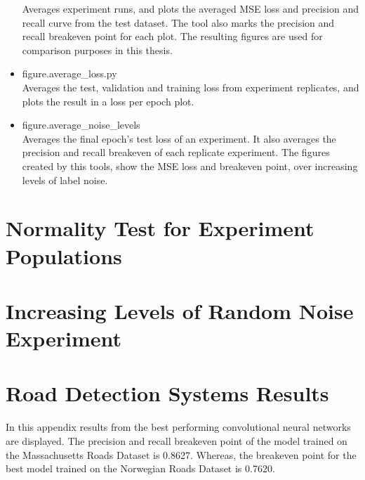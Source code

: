 \begin{itemize}
Averages experiment runs, and plots the averaged MSE loss and precision and recall curve from the test dataset. The tool also marks the precision and recall breakeven point for each plot. The resulting figures are used for comparison purposes in this thesis.
\item figure.average\_loss.py\\
Averages the test, validation and training loss from experiment replicates, and plots the result in a loss per epoch plot. 
\item figure.average\_noise\_levels\\
Averages the final epoch's test loss of an experiment. It also averages the precision and recall breakeven of each replicate experiment. The figures created by this tools, show the MSE loss and breakeven point, over increasing levels of label noise.
\end{itemize}

\section{Normality Test for Experiment Populations}
\label{app:normality}

\section{Increasing Levels of Random Noise Experiment}
\label{app:randomnoiseexperiment}

\pagebreak
\section{Road Detection Systems Results}
\label{app:roaddetectionresults}
In this appendix results from the best performing convolutional neural networks are displayed. The precision and recall breakeven point of the model trained on the Massachusetts Roads Dataset is 0.8627. Whereas, the breakeven point for the best model trained on the Norwegian Roads Dataset is 0.7620.

